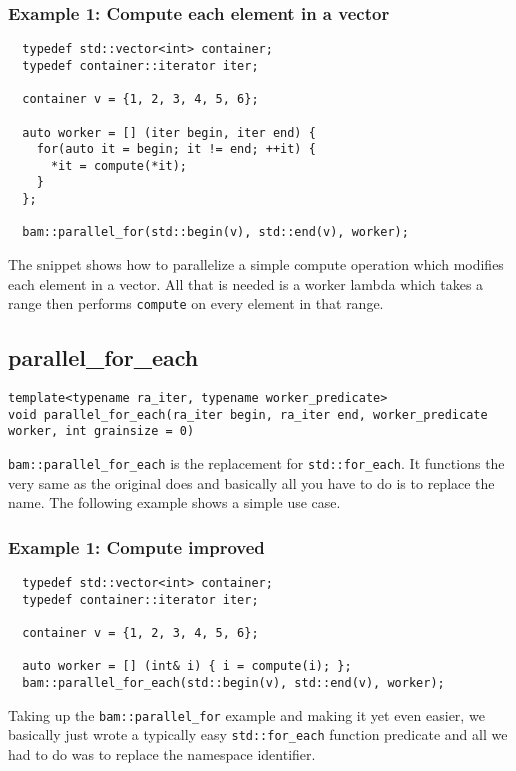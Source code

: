 \documentclass[11pt, a4paper]{article}
\begin{document}
\subsubsection{Example 1: Compute each element in a vector}

\begin{lstlisting} 
  typedef std::vector<int> container;
  typedef container::iterator iter;

  container v = {1, 2, 3, 4, 5, 6};

  auto worker = [] (iter begin, iter end) {
    for(auto it = begin; it != end; ++it) {
      *it = compute(*it);
    }
  };

  bam::parallel_for(std::begin(v), std::end(v), worker);
\end{lstlisting}
The snippet shows how to parallelize a simple compute operation which modifies each element in a vector. All that is needed is a worker lambda which takes a range then performs \texttt{compute} on every element in that range. 

\subsection{parallel\_for\_each}
\begin{lstlisting}
template<typename ra_iter, typename worker_predicate>
void parallel_for_each(ra_iter begin, ra_iter end, worker_predicate worker, int grainsize = 0)
\end{lstlisting}

\texttt{bam::parallel\_for\_each} is the replacement for \texttt{std::for\_each}. It functions the very same as the original does and basically all you have to do is to replace the name. The following example shows a simple use case.

\subsubsection{Example 1: Compute improved}
\begin{lstlisting}
  typedef std::vector<int> container;
  typedef container::iterator iter;

  container v = {1, 2, 3, 4, 5, 6};

  auto worker = [] (int& i) { i = compute(i); };
  bam::parallel_for_each(std::begin(v), std::end(v), worker);
\end{lstlisting}

Taking up the \texttt{bam::parallel\_for} example and making it yet even easier, we basically just wrote a typically easy \texttt{std::for\_each} function predicate and all we had to do was to replace the namespace identifier. 
\end{document}
